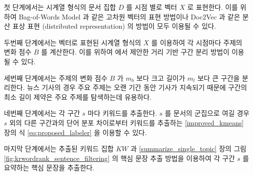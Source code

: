 \documentclass[oneside, ko,phd]{snuthesis_utf8_kor}
\begin{document}
첫 단계에서는 시계열 형식의 문서 집합 $D$ 를 시점 별로 벡터 $X$ 로 표현한다.
이를 위하여 Bag-of-Words Model 과 같은 고차원 벡터의 표현 방법이나 Doc2Vec 과 같은 분산 표상 표현 (distributed representation) 의 방법이 모두 이용될 수 있다.

두번째 단계에서는 벡터로 표현된 시계열 형식의 $X$ 를 이용하여 각 시점마다 주제의 변화 점수 $B$ 를 계산한다.
이를 위하여 \cite{kim2019representation} 에서 제안한 거리 기반 구간 분리 방법이 이용될 수 있다.

세번째 단계에서는 주제의 변화 점수 $B$ 가 $m_b$ 보다 크고 길이가 $m_l$ 보다 큰 구간을 분리한다.
뉴스 기사의 경우 주요 주제는 오랜 기간 동안 기사가 지속되기 때문에 구간의 최소 길이 제약은 주요 주제를 탐색하는데 유용하다.

네번째 단계에서는 각 구간 $s$ 마다 키워드를 추출한다.
$s$ 를 문서의 군집으로 여길 경우 $s$ 외의 다른 구간과의 단어 분포 차이로부터 키워드를 추출하는  \ref{improved_kmeans} 장의 식 \ref{eq:proposed_labeler} 을 이용할 수 있다.

마지막 단계에서는 추출된 키워드 집합 $KW$ 과 \ref{summarize_single_topic} 장의 그림 \ref{fig:krwordrank_sentence_filtering} 의 핵심 문장 추출 방법을 이용하여 각 구간 $s$ 를 요약하는 핵심 문장을 추출한다.
\end{document}
